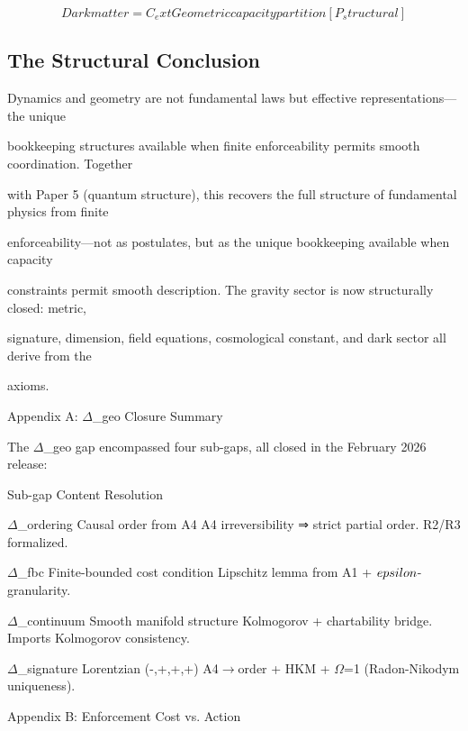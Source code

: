 \documentclass[11pt]{article}
\begin{document}
\[Dark matter = C_ext           Geometric capacity partition              [P_structural]\]



\subsection{The Structural Conclusion}

Dynamics and geometry are not fundamental laws but effective representations---the unique

bookkeeping structures available when finite enforceability permits smooth coordination. Together

with Paper 5 (quantum structure), this recovers the full structure of fundamental physics from finite

enforceability---not as postulates, but as the unique bookkeeping available when capacity

constraints permit smooth description. The gravity sector is now structurally closed: metric,

signature, dimension, field equations, cosmological constant, and dark sector all derive from the

axioms.



Appendix A: $\Delta$_geo Closure Summary

The $\Delta$_geo gap encompassed four sub-gaps, all closed in the February 2026 release:



Sub-gap              Content                             Resolution



$\Delta$_ordering           Causal order from A4                A4 irreversibility ⇒ strict partial order. R2/R3 formalized.



$\Delta$_fbc                Finite-bounded cost condition       Lipschitz lemma from A1 + $\\epsilon$-granularity.



$\Delta$_continuum          Smooth manifold structure           Kolmogorov + chartability bridge. Imports Kolmogorov consistency.



$\Delta$_signature          Lorentzian (-,+,+,+)                A4$\to$order + HKM + $\Omega$=1 (Radon-Nikodym uniqueness).



Appendix B: Enforcement Cost vs. Action
\end{document}

